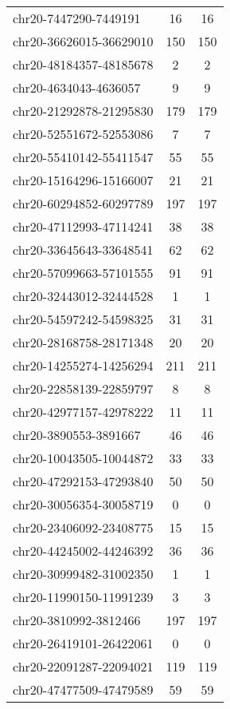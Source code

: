 \documentclass[10pt,letterpaper]{article}
\begin{document}
{\begin{longtable}{lSS}
	chr20-7447290-7449191   & 16     & 16       \\
	chr20-36626015-36629010 & 150    & 150      \\
	chr20-48184357-48185678 & 2      & 2        \\
	chr20-4634043-4636057   & 9      & 9        \\
	chr20-21292878-21295830 & 179    & 179      \\
	chr20-52551672-52553086 & 7      & 7        \\
	chr20-55410142-55411547 & 55     & 55       \\
	chr20-15164296-15166007 & 21     & 21       \\
	chr20-60294852-60297789 & 197    & 197      \\
	chr20-47112993-47114241 & 38     & 38       \\
	chr20-33645643-33648541 & 62     & 62       \\
	chr20-57099663-57101555 & 91     & 91       \\
	chr20-32443012-32444528 & 1      & 1        \\
	chr20-54597242-54598325 & 31     & 31       \\
	chr20-28168758-28171348 & 20     & 20       \\
	chr20-14255274-14256294 & 211    & 211      \\
	chr20-22858139-22859797 & 8      & 8        \\
	chr20-42977157-42978222 & 11     & 11       \\
	chr20-3890553-3891667   & 46     & 46       \\
	chr20-10043505-10044872 & 33     & 33       \\
	chr20-47292153-47293840 & 50     & 50       \\
	chr20-30056354-30058719 & 0      & 0        \\
	chr20-23406092-23408775 & 15     & 15       \\
	chr20-44245002-44246392 & 36     & 36       \\
	chr20-30999482-31002350 & 1      & 1        \\
	chr20-11990150-11991239 & 3      & 3        \\
	chr20-3810992-3812466   & 197    & 197      \\
	chr20-26419101-26422061 & 0      & 0        \\
	chr20-22091287-22094021 & 119    & 119      \\
	chr20-47477509-47479589 & 59     & 59       \\

\end{longtable}}
\end{document}
